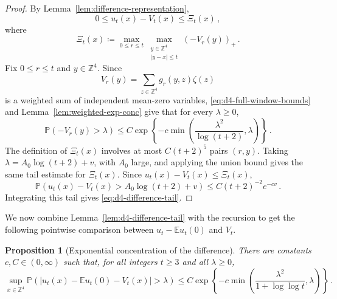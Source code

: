 \documentclass[11pt]{amsart}
\theoremstyle{plain}
\newtheorem{proposition}[theorem]{Proposition}
\theoremstyle{definition}
\newcommand{\Z}{\mathbb{Z}}
\newcommand{\E}{\mathbb{E}}
\renewcommand{\P}{\mathbb{P}}
\begin{document}
		\begin{proof}
			By Lemma~\ref{lem:difference-representation},
			\[
				0\leq u_t(x)-V_t(x)\leq \Xi_t(x)\, ,
			\]
			where
			\[
				\Xi_t(x)\coloneqq
				\max_{0\leq r\leq t}
				\max_{\substack{y\in\Z^4\\ |y-x|\leq t}}
				(-V_r(y))_+\, .
			\]
			Fix $0\leq r\leq t$ and $y\in\Z^4$. Since
			\[
				V_r(y)=\sum_{z\in\Z^4}g_r(y,z)\zeta(z)
			\]
			is a weighted sum of independent mean-zero variables,
			\eqref{eq:d4-full-window-bounds} and
			Lemma~\ref{lem:weighted-exp-conc} give that for every $\lambda\geq0$,
			\[
				\P\left(-V_r(y)>\lambda\right)
				\leq
				C\exp\left\{
				-c\min\left(\frac{\lambda^2}{\log(t+2)},\lambda\right)
				\right\}\, .
			\]
			The definition of $\Xi_t(x)$ involves at most $C(t+2)^5$ pairs $(r,y)$.
			Taking $\lambda=A_0\log(t+2)+v$, with $A_0$ large, and applying the
			union bound gives the same tail estimate for $\Xi_t(x)$. Since
			$u_t(x)-V_t(x)\leq \Xi_t(x)$,
			\[
				\P\left(
				u_t(x)-V_t(x)>A_0\log(t+2)+v
				\right)
				\leq C(t+2)^{-2}e^{-cv}\, .
			\]
			Integrating this tail gives
			\eqref{eq:d4-difference-tail}.
		\end{proof}

		We now combine Lemma~\ref{lem:d4-difference-tail} with the recursion to get the following pointwise comparison between
		$u_t-\E u_t(0)$ and $V_t$.

		\begin{proposition}[Exponential concentration of the difference]\label{prop:d4-pointwise-linearization}
			There are constants $c,C\in(0,\infty)$ such that, for all integers
			$t\geq3$ and all $\lambda\geq0$,
			\[
				\sup_{x\in\Z^4}
				\P\left(
				\left|u_t(x)-\E u_t(0)-V_t(x)\right|>\lambda
				\right)
				\leq
				C\exp\left\{
				-c\min\left(
				\frac{\lambda^2}{1+\log\log t},\lambda
				\right)
				\right\}\, .
			\]
		\end{proposition}
\end{document}
